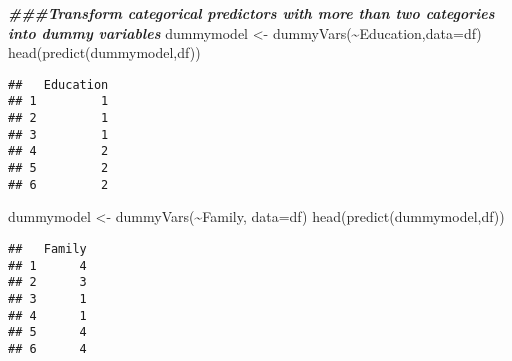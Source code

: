\documentclass[
]{article}
\newenvironment{Shaded}{\begin{snugshade}}{\end{snugshade}}
\newcommand{\AttributeTok}[1]{\textcolor[rgb]{0.77,0.63,0.00}{#1}}
\newcommand{\DocumentationTok}[1]{\textcolor[rgb]{0.56,0.35,0.01}{\textbf{\textit{#1}}}}
\newcommand{\FunctionTok}[1]{\textcolor[rgb]{0.00,0.00,0.00}{#1}}
\newcommand{\NormalTok}[1]{#1}
\newcommand{\OtherTok}[1]{\textcolor[rgb]{0.56,0.35,0.01}{#1}}
\newcommand{\SpecialCharTok}[1]{\textcolor[rgb]{0.00,0.00,0.00}{#1}}
\begin{document}
\begin{Shaded}
\begin{Highlighting}[]
\DocumentationTok{\#\#\#Transform categorical predictors with more than two categories into dummy variables}
\NormalTok{dummymodel }\OtherTok{\textless{}{-}} \FunctionTok{dummyVars}\NormalTok{(}\SpecialCharTok{\textasciitilde{}}\NormalTok{Education,}\AttributeTok{data=}\NormalTok{df)}
\FunctionTok{head}\NormalTok{(}\FunctionTok{predict}\NormalTok{(dummymodel,df))}
\end{Highlighting}
\end{Shaded}

\begin{verbatim}
##   Education
## 1         1
## 2         1
## 3         1
## 4         2
## 5         2
## 6         2
\end{verbatim}

\begin{Shaded}
\begin{Highlighting}[]
\NormalTok{dummymodel }\OtherTok{\textless{}{-}} \FunctionTok{dummyVars}\NormalTok{(}\SpecialCharTok{\textasciitilde{}}\NormalTok{Family, }\AttributeTok{data=}\NormalTok{df)}
\FunctionTok{head}\NormalTok{(}\FunctionTok{predict}\NormalTok{(dummymodel,df))}
\end{Highlighting}
\end{Shaded}

\begin{verbatim}
##   Family
## 1      4
## 2      3
## 3      1
## 4      1
## 5      4
## 6      4
\end{verbatim}

\begin{Shaded}
\end{Shaded}
\end{document}
